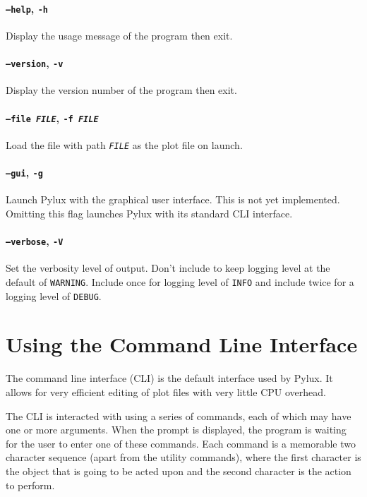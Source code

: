 \documentclass[a4paper]{article}
\begin{document}
\paragraph{\texttt{--help}, \texttt{-h}}
Display the usage message of the program then exit.

\paragraph{\texttt{--version}, \texttt{-v}}
Display the version number of the program then exit.

\paragraph{\texttt{--file \textit{FILE}}, \texttt{-f \textit{FILE}}} 
Load the file with path \texttt{\textit{FILE}} as the plot file on launch.

\paragraph{\texttt{--gui}, \texttt{-g}}
Launch Pylux with the graphical user interface. This is not yet implemented. 
Omitting this flag launches Pylux with its standard CLI interface.

\paragraph{\texttt{--verbose}, \texttt{-V}}
Set the verbosity level of output. Don't include to keep logging level at the 
default of \texttt{WARNING}. Include once for logging level of \texttt{INFO} 
and include twice for a logging level of \texttt{DEBUG}.

\section{Using the Command Line Interface}
The command line interface (CLI) is the default interface used by Pylux. It 
allows for very efficient editing of plot files with very little CPU overhead. 

The CLI is interacted with using a series of commands, each of which may have 
one or more arguments. When the prompt is displayed, the program is waiting 
for the user to enter one of these commands. Each command is a memorable 
two character sequence (apart from the utility commands), where the first 
character is the object that is going to be acted upon and the second 
character is the action to perform.
\end{document}
